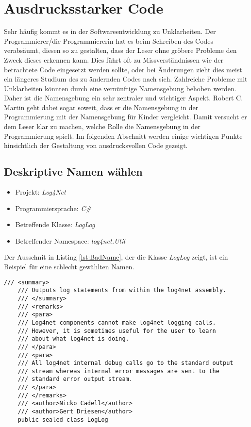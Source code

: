 \section{Ausdrucksstarker Code}
Sehr häufig kommt es in der Softwareentwicklung zu Unklarheiten. Der Programmierer/die Programmiererin hat es beim Schreiben des Codes verabsäumt, diesen so zu gestalten, dass der Leser ohne gröbere Probleme den Zweck dieses erkennen kann. Dies führt oft zu Missverständnissen wie der betrachtete Code eingesetzt werden sollte, oder bei Änderungen zieht dies meist ein längeres Studium des zu ändernden Codes nach sich. Zahlreiche Probleme mit Unklarheiten könnten durch eine vernünftige Namensgebung behoben werden. Daher ist die Namensgebung ein sehr zentraler und wichtiger Aspekt. Robert C. Martin geht dabei sogar soweit, dass er die Namensgebung in der Programmierung mit der Namensgebung für Kinder vergleicht. Damit versucht er dem Leser klar zu machen, welche Rolle die Namensgebung in der Programmierung spielt. Im
folgenden Abschnitt werden einige wichtigen Punkte hinsichtlich der Gestaltung von ausdrucksvollen Code gezeigt.

\subsection{Deskriptive Namen wählen}
\begin{itemize}
	\item Projekt: \textit{Log4Net}
	\item Programmiersprache: \textit{C\#}
	\item Betreffende Klasse: \textit{LogLog}
	\item Betreffender Namespace: \textit{log4net.Util}
\end{itemize}

\SuperPar Der Ausschnit in Listing \ref{lst:BadName}, der die Klasse \textit{LogLog} zeigt, ist ein Beispiel für eine schlecht gewählten Namen.

\begin{lstlisting}[language={[Sharp]C}, caption=Beispiele für schlechte Namensgebung, label=lst:BadName]
/// <summary>
	/// Outputs log statements from within the log4net assembly.
	/// </summary>
	/// <remarks>
	/// <para>
	/// Log4net components cannot make log4net logging calls.
	/// However, it is sometimes useful for the user to learn 
	/// about what log4net is doing.
	/// </para>
	/// <para>
	/// All log4net internal debug calls go to the standard output 
	/// stream whereas internal error messages are sent to the 
	/// standard error output stream.
	/// </para>
	/// </remarks>
	/// <author>Nicko Cadell</author>
	/// <author>Gert Driesen</author>
	public sealed class LogLog
\end{lstlisting}

